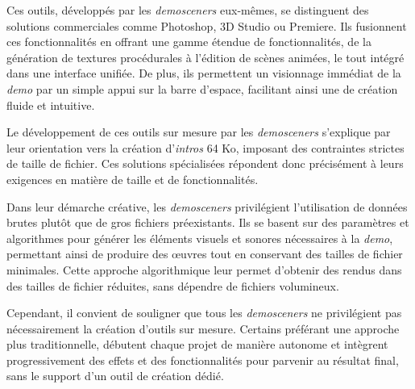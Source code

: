 Ces outils, développés par les \textit{demosceners} eux-mêmes, se distinguent des solutions commerciales comme Photoshop, 3D Studio ou Premiere. Ils fusionnent ces fonctionnalités en offrant une gamme étendue de fonctionnalités, de la génération de textures procédurales à l'édition de scènes animées, le tout intégré dans une interface unifiée. De plus, ils permettent un visionnage immédiat de la \textit{demo} par un simple appui sur la barre d'espace, facilitant ainsi une   de création fluide et intuitive.

Le développement de ces outils sur mesure par les \textit{demosceners} s'explique par leur orientation vers la création d'\textit{intros} 64 Ko, imposant des contraintes strictes de taille de fichier. Ces solutions spécialisées répondent donc précisément à leurs exigences en matière de taille et de fonctionnalités.



Dans leur démarche créative, les \textit{demosceners} privilégient l'utilisation de données brutes plutôt que de gros fichiers préexistants. Ils se basent sur des paramètres et algorithmes pour générer les éléments visuels et sonores nécessaires à la \textit{demo}, permettant ainsi de produire des œuvres tout en conservant des tailles de fichier minimales. Cette approche algorithmique leur permet d'obtenir des rendus dans des tailles de fichier réduites, sans dépendre de fichiers volumineux.

Cependant, il convient de souligner que tous les \textit{demosceners} ne privilégient pas nécessairement la création d'outils sur mesure. Certains préférant une approche plus traditionnelle, débutent chaque projet de manière autonome et intègrent progressivement des effets et des fonctionnalités pour parvenir au résultat final, sans le support d'un outil de création dédié.

